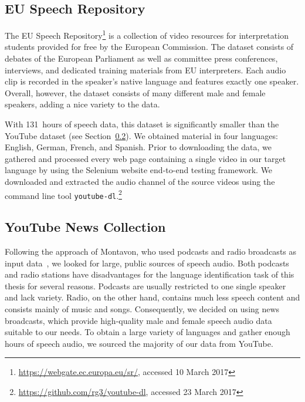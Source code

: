 \subsection{EU Speech Repository}

	The EU Speech Repository\footnote{\url{https://webgate.ec.europa.eu/sr/}, accessed 10 March 2017} is a collection of video resources for interpretation students provided for free by the European Commission. The dataset consists of debates of the European Parliament as well as committee press conferences, interviews, and dedicated training materials from EU interpreters. Each audio clip is recorded in the speaker's native language and features exactly one speaker. Overall, however, the dataset consists of many different male and female speakers, adding a nice variety to the data.

		With \num{131}~hours of speech data, this dataset is significantly smaller than the YouTube dataset (see Section~\ref{sec:youtube_news}). We obtained material in four languages: English, German, French, and Spanish. Prior to downloading the data, we gathered and processed every web page containing a single video in our target language by using the Selenium website end-to-end testing framework. We downloaded and extracted the audio channel of the source videos using the command line tool \texttt{youtube-dl}.\footnote{\url{https://github.com/rg3/youtube-dl}, accessed 23 March 2017}

\subsection{YouTube News Collection}
\label{sec:youtube_news}

	Following the approach of Montavon, who used podcasts and radio broadcasts as input data~\cite{montavon2009deep}, we looked for large, public sources of speech audio. Both podcasts and radio stations have disadvantages for the language identification task of this thesis for several reasons. Podcasts are usually restricted to one single speaker and lack variety. Radio, on the other hand, contains much less speech content and consists mainly of music and songs. Consequently, we decided on using news broadcasts, which provide high-quality male and female speech audio data suitable to our needs. To obtain a large variety of languages and gather enough hours of speech audio, we sourced the majority of our data from YouTube.

